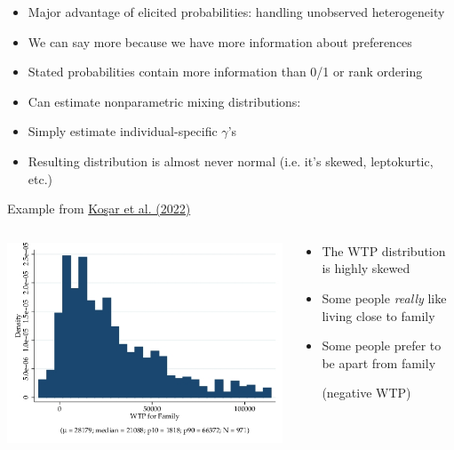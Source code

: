 \documentclass[aspectratio=169]{beamer}
\begin{document}
\begin{frame}

\begin{itemize}
\itemsep1.5em
\item<1-> Major advantage of elicited probabilities: handling unobserved heterogeneity
\item<2-> We can say more because we have more information about preferences
\item<3-> Stated probabilities contain more information than 0/1 or rank ordering
\item<4-> Can estimate nonparametric mixing distributions:
\item<5-> Simply estimate individual-specific $\gamma$'s
\item<6-> Resulting distribution is almost never normal (i.e. it's skewed, leptokurtic, etc.)
\end{itemize}

\end{frame}

\begin{frame}

Example from \href{https://www.sciencedirect.com/science/article/abs/pii/S0304407621000415}{Ko\c{s}ar et al. (2022)}

\bigskip

\begin{columns}[T]
\begin{column}{0.6\textwidth}
\includegraphics[width=\textwidth]{histo_wtp_family.jpg}
\end{column}
\begin{column}{0.4\textwidth}
\begin{itemize}
\itemsep1.5em
\item<2-> The WTP distribution is highly skewed
\item<3-> Some people \textit{really} like living close to family
\item<4-> Some people prefer to be apart from family\par (negative WTP)
\end{itemize}
\end{column}
\end{columns}

\end{frame}
\end{document}
